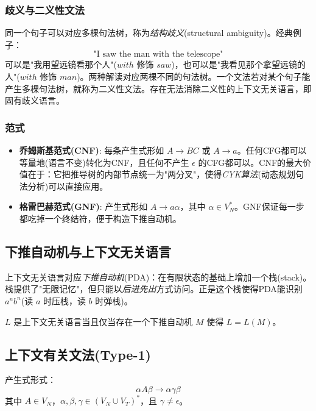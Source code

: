 \subsubsection{歧义与二义性文法}

同一个句子可以对应多棵句法树，称为\emph{结构歧义}(structural ambiguity)。经典例子：
\begin{equation}
    \text{"I saw the man with the telescope"}
\end{equation}
可以是"我用望远镜看那个人"($with$ 修饰 $saw$)，也可以是"我看见那个拿望远镜的人"($with$ 修饰 $man$)。两种解读对应两棵不同的句法树。一个文法若对某个句子能产生多棵句法树，就称为二义性文法。存在无法消除二义性的上下文无关语言，即固有歧义语言。

\subsubsection{范式}

\begin{itemize}
    \item \textbf{乔姆斯基范式(CNF)}: 每条产生式形如 $A \rightarrow BC$ 或 $A \rightarrow a$。任何CFG都可以等量地(语言不变)转化为CNF，且任何不产生 $\epsilon$ 的CFG都可以。CNF的最大价值在于：它把推导树的内部节点统一为"两分叉"，使得\emph{CYK算法}(动态规划句法分析)可以直接应用。
    \item \textbf{格雷巴赫范式(GNF)}: 产生式形如 $A \rightarrow a\alpha$，其中 $\alpha \in V_N^*$。GNF保证每一步都吃掉一个终结符，便于构造下推自动机。
\end{itemize}

\subsection{下推自动机与上下文无关语言}

上下文无关语言对应\emph{下推自动机}(PDA)：在有限状态的基础上增加一个栈(stack)。栈提供了"无限记忆"，但只能以\emph{后进先出}方式访问。正是这个栈使得PDA能识别 $a^n b^n$(读 $a$ 时压栈，读 $b$ 时弹栈)。

\begin{theorem}
$L$ 是上下文无关语言当且仅当存在一个下推自动机 $M$ 使得 $L = L(M)$。
\end{theorem}

\subsection{上下文有关文法(Type-1)}

产生式形式：
\begin{equation}
    \alpha A \beta \rightarrow \alpha \gamma \beta
\end{equation}
其中 $A \in V_N$，$\alpha, \beta, \gamma \in (V_N \cup V_T)^*$，且 $\gamma \neq \epsilon$。

